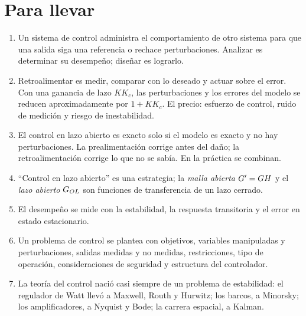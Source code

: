 \section{Para llevar}
\label{sec:in-cierre}

\begin{parallevar}
\begin{enumerate}
  \item Un sistema de control administra el comportamiento de otro sistema para que una salida siga una referencia o rechace perturbaciones. Analizar es determinar su desempeño; diseñar es lograrlo.
  \item Retroalimentar es medir, comparar con lo deseado y actuar sobre el error. Con una ganancia de lazo $KK_c$, las perturbaciones y los errores del modelo se reducen aproximadamente por $1+KK_c$. El precio: esfuerzo de control, ruido de medición y riesgo de inestabilidad.
  \item El control en lazo abierto es exacto solo si el modelo es exacto y no hay perturbaciones. La prealimentación corrige antes del daño; la retroalimentación corrige lo que no se sabía. En la práctica se combinan.
  \item ``Control en lazo abierto'' es una estrategia; la \emph{malla abierta} $G'=GH$ y el \emph{lazo abierto} $G_{OL}$ son funciones de transferencia de un lazo cerrado.
  \item El desempeño se mide con la estabilidad, la respuesta transitoria y el error en estado estacionario.
  \item Un problema de control se plantea con objetivos, variables manipuladas y perturbaciones, salidas medidas y no medidas, restricciones, tipo de operación, consideraciones de seguridad y estructura del controlador.
  \item La teoría del control nació casi siempre de un problema de estabilidad: el regulador de Watt llevó a Maxwell, Routh y Hurwitz; los barcos, a Minorsky; los amplificadores, a Nyquist y Bode; la carrera espacial, a Kalman.
\end{enumerate}
\end{parallevar}

